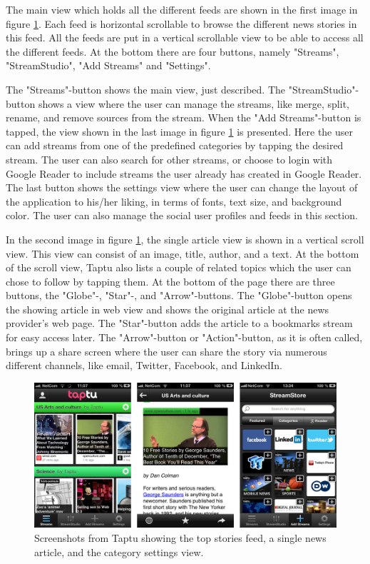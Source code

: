 The main view which holds all the different feeds are shown in the first image in figure \ref{screenshots_taptu}. Each feed is horizontal scrollable to browse the different news stories in this feed. All the feeds are put in a vertical scrollable view to be able to access all the different feeds. At the bottom there are four buttons, namely "Streams", "StreamStudio", "Add Streams" and "Settings".

The "Streams"-button shows the main view, just described. The "StreamStudio"-button shows a view where the user can manage the streams, like merge, split, rename, and remove sources from the stream. When the "Add Streams"-button is tapped, the view shown in the last image in figure \ref{screenshots_taptu} is presented. Here the user can add streams from one of the predefined categories by tapping the desired stream. The user can also search for other streams, or choose to login with Google Reader to include streams the user already has created in Google Reader. The last button shows the settings view where the user can change the layout of the application to his/her liking, in terms of fonts, text size, and background color. The user can also manage the social user profiles and feeds in this section.

In the second image in figure \ref{screenshots_taptu}, the single article view is shown in a vertical scroll view. This view can consist of an image, title, author, and a text. At the bottom of the scroll view, Taptu also lists a couple of related topics which the user can chose to follow by tapping them. At the bottom of the page there are three buttons, the "Globe"-, "Star"-, and "Arrow"-buttons. The "Globe"-button opens the showing article in web view and shows the original article at the news provider's web page. The "Star"-button adds the article to a bookmarks stream for easy access later. The "Arrow"-button or "Action"-button, as it is often called, brings up a share screen where the user can share the story via numerous different channels, like email, Twitter, Facebook, and LinkedIn.

\begin{figure}[!htbp]
\centering
\includegraphics[width=130mm]{GFX/screenshots/taptu.png}
\caption{Screenshots from Taptu showing the top stories feed, a single news article, and the category settings view.}
\label{screenshots_taptu}
\end{figure}

